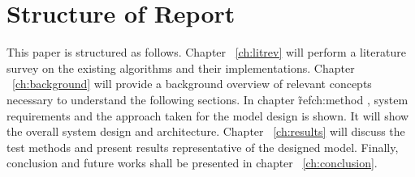 %
%


\section{Structure of Report}
This paper is structured as follows. Chapter ~\ref{ch:litrev} will perform a
literature survey on the existing algorithms and their implementations. Chapter
~\ref{ch:background}  will provide a background overview of relevant concepts
necessary to understand the following sections. In chapter  \~ref{ch:method },
system requirements and the approach taken for the model design is shown. It
will show the overall system design and architecture.  Chapter
~\ref{ch:results} will discuss the test methods and present results
representative of the designed model. Finally, conclusion and future works
shall be presented in chapter ~\ref{ch:conclusion}. 



